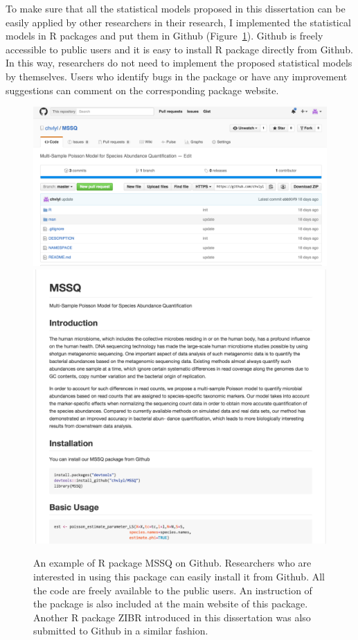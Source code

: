 To make sure that all the statistical models proposed in this dissertation can be easily applied by other researchers in their research, I implemented the statistical models in R packages and put them in Github (Figure~\ref{Github_MSSQ}). Github is freely accessible to public users and it is easy to install R package directly from Github. In this way, researchers do not need to implement the proposed statistical models by themselves. Users who identify bugs in the package or have any improvement suggestions can comment on the corresponding  package website. 

\begin{figure}[p]
	\centering
	{\includegraphics[scale=0.4,trim=0 0 0 0,clip]{Figure/F62_Github_MSSQ1.pdf}
	\includegraphics[scale=0.4,trim=0 0 0 0,clip]{Figure/F63_Github_MSSQ2.pdf}
		
	}
	\caption[An example of my R package on Github]{An example of R package MSSQ on Github. Researchers who are interested in using this package can easily install it from Github. All the code are freely available to the public users. An instruction of the package is also included at the main website of this package. Another R package ZIBR introduced in this dissertation was also submitted to Github in a similar fashion.
	}
	\label{Github_MSSQ}
\end{figure}


